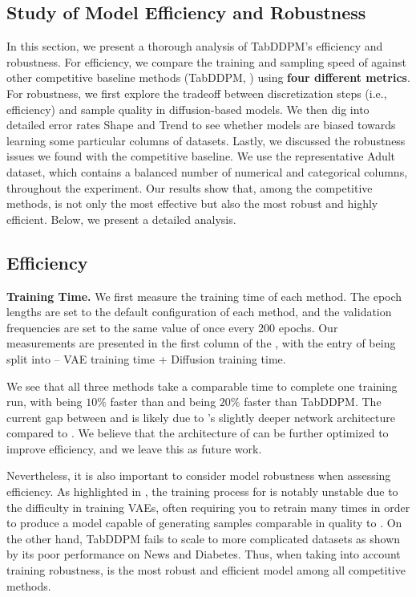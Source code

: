 \begin{rebuttal}
\section{Study of Model Efficiency and Robustness}
In this section, we present a thorough analysis of TabDDPM's efficiency and robustness. For efficiency, we compare the training and sampling speed of \method against other competitive baseline methods (TabDDPM, \tabsyn) using \textbf{four different metrics}. For robustness, we first explore the tradeoff between discretization steps (i.e.,  efficiency) and sample quality in diffusion-based models. We then dig into detailed error rates Shape and Trend to see whether models are biased towards learning some particular columns of datasets. Lastly, we discussed the robustness issues we found with the competitive baseline. We use the representative Adult dataset, which contains a balanced number of numerical and categorical columns, throughout the experiment. Our results show that, among the competitive methods, \method is not only the most effective but also the most robust and highly efficient. Below, we present a detailed analysis.

\subsection{Efficiency}
\textbf{Training Time.} We first measure the training time of each method. The epoch lengths are set to the default configuration of each method, and the validation frequencies are set to the same value of once every 200 epochs. Our measurements are presented in the first column of the , with the entry of \tabsyn being split into – VAE training time + Diffusion training time. 

We see that all three methods take a comparable time to complete one training run, with \tabsyn being $10\%$ faster than \method and \method being $20\%$ faster than TabDDPM. The current gap between \method and \tabsyn is likely due to \method’s slightly deeper network architecture compared to \tabsyn. We believe that the architecture of \method can be further optimized to improve efficiency, and we leave this as future work.

Nevertheless, it is also important to consider model robustness when assessing efficiency. As highlighted in , the training process for \tabsyn is notably unstable due to the difficulty in training VAEs, often requiring you to retrain many times in order to produce a model capable of generating samples comparable in quality to \method. On the other hand, TabDDPM fails to scale to more complicated datasets as shown by its poor performance on News and Diabetes. Thus, when taking into account training robustness, \method is the most robust and efficient model among all competitive methods.


\end{rebuttal}

